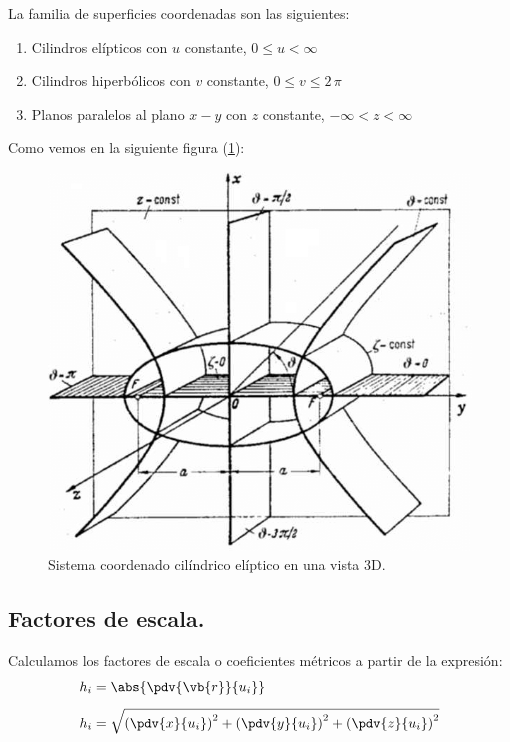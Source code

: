 La familia de superficies coordenadas son las siguientes:
\begin{enumerate}
\item Cilindros elípticos con $u$ constante, $0 \leq u < \infty$
\item Cilindros hiperbólicos con $v$ constante, $0 \leq v \leq 2 \, \pi$
\item Planos paralelos al plano $x-y$ con $z$ constante, $-\infty < z < \infty$
\end{enumerate}
Como vemos en la siguiente figura (\ref{fig:figura_coordenada_cilindricas_elipticas_3D}):

\begin{figure}[H]
    \centering
    \includegraphics[scale=0.6]{Imagenes/Elliptic-cylindrical-coordinates_02.png}
    \caption{Sistema coordenado cilíndrico elíptico en una vista 3D.}
    \label{fig:figura_coordenada_cilindricas_elipticas_3D}
\end{figure}

\subsection{Factores de escala.}

Calculamos los factores de escala o coeficientes métricos a partir de la expresión:
\begin{align*}
h_{i} &= \abs{\pdv{\vb{r}}{u_{i}}} \\[0.5em]
h_{i} &= \sqrt{ \left( \pdv{x}{u_{i}} \right)^{2} + \left( \pdv{y}{u_{i}} \right)^{2} + \left( \pdv{z}{u_{i}} \right)^{2}}
\end{align*}


